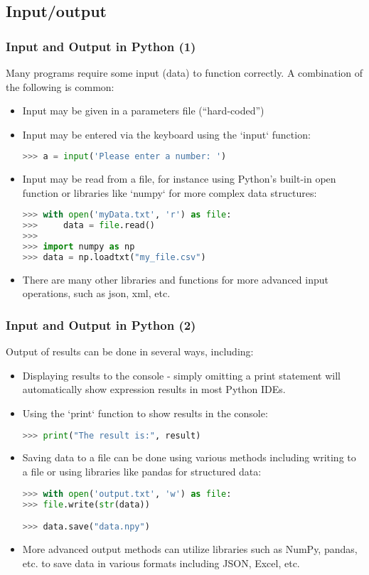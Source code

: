 \subsection{Input/output}
\begin{frame}[fragile]
  \frametitle{Input and Output in Python (1)}
  Many programs require some input (data) to function correctly. A combination of the following is common:
  \begin{itemize}[<+->]
    \item Input may be given in a parameters file (``hard-coded'')
    \item Input may be entered via the keyboard using the `input` function:
    \begin{lstlisting}[language=Python,numbers=none]
>>> a = input('Please enter a number: ')
    \end{lstlisting}
    \item Input may be read from a file, for instance using Python's built-in open function or libraries like `numpy` for more complex data structures:
    \begin{lstlisting}[language=Python,numbers=none]
>>> with open('myData.txt', 'r') as file:
>>>     data = file.read()
>>> 
>>> import numpy as np
>>> data = np.loadtxt("my_file.csv")
    \end{lstlisting}
    \item There are many other libraries and functions for more advanced input operations, such as json, xml, etc.
  \end{itemize}
 \end{frame}

 \begin{frame}[fragile]
  \frametitle{Input and Output in Python (2)}
  Output of results can be done in several ways, including:
  \begin{itemize}[<+->]
    \item Displaying results to the console - simply omitting a print statement will automatically show expression results in most Python IDEs.
    \item Using the `print` function to show results in the console:
    \begin{lstlisting}[language=Python,numbers=none]
>>> print("The result is:", result)
    \end{lstlisting}
    \item Saving data to a file can be done using various methods including writing to a file or using libraries like pandas for structured data:
    \begin{lstlisting}[language=Python,numbers=none]
>>> with open('output.txt', 'w') as file:
>>> file.write(str(data))

>>> data.save("data.npy")
    \end{lstlisting}
    \item More advanced output methods can utilize libraries such as NumPy, pandas, etc. to save data in various formats including JSON, Excel, etc.
  \end{itemize}
 \end{frame}
 
